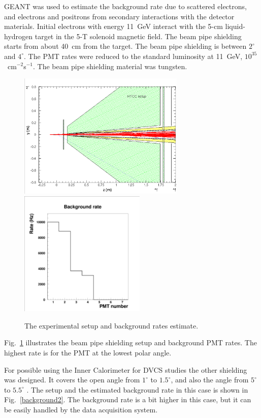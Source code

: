 GEANT was used to estimate the background rate due to scattered electrons,
and electrons and positrons from secondary interactions with the detector 
materials.  Initial electrons with energy 11~GeV interact with the 5-cm 
liquid-hydrogen target in the 5-T solenoid magnetic field.  The beam pipe 
shielding starts from about 40~cm from the target.  The beam pipe shielding 
is between $2^\circ$ and $4^\circ$.  The PMT rates were reduced to the 
standard luminosity at 11~GeV, $10^{35}$~cm$^{-2}$s$^{-1}$.  The beam pipe 
shielding material was tungsten.

\begin{figure}[htbp]
\centering
\includegraphics[height=6cm,angle=0]{MC-simulation/setup12.eps}
\includegraphics[height=6cm,angle=0]{MC-simulation/backgr1.eps}
\caption{\small{The experimental setup and background rates estimate.}}
\label{background1}
\end{figure}

Fig.~\ref{background1} illustrates the beam pipe shielding setup and 
background PMT rates.  The highest rate is for the PMT at the lowest polar
angle.

For possible using the Inner Calorimeter for DVCS studies the other shielding
was designed. It covers the open angle from  $1^\circ$ to $1.5^\circ$,
and also the angle from  $5^\circ$ to $5.5^\circ$ . The setup and the
estimated background rate in this case is shown  in Fig.~\ref{background2}.
The background rate is a bit higher in this case, but
it can be easily handled by the data acquisition system.

